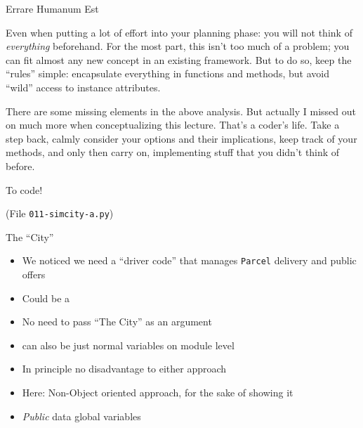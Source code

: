 
\begin{frame}{Errare Humanum Est}
%
\begin{hintbox}
Even when putting a lot of effort into your planning phase: you will not think of \emph{everything} beforehand. For the most part, this isn't too much of a problem; you can fit almost any new concept in an existing framework. But to do so, keep the \enquote{rules} simple: encapsulate everything in functions and methods, but avoid \enquote{wild} access to instance attributes.

\vspace{6pt}
There are some missing elements in the above analysis. But actually I missed out on much more when conceptualizing this lecture. That's a coder's life. Take a step back, calmly consider your options and their implications, keep track of your methods, and only then carry on, implementing stuff that you didn't think of before.
\end{hintbox}
%
\end{frame}


\begin{frame}{To code!}
%
\begin{center}
\begin{Large}
(File \texttt{011-simcity-a.py})
\end{Large}
\end{center}
%
\end{frame}


\begin{frame}[fragile]{The \enquote{City}}
%
\begin{itemize}
\item We noticed we need a \enquote{driver code} that manages \texttt{Parcel} delivery and public offers
\item Could be a 
\item No need to pass \enquote{The City} as an argument
\item[\Thus] can also be just normal variables on module level
\item In principle no disadvantage to either approach
\item Here: Non-Object oriented approach, for the sake of showing it
\item \emph{Public} data \Thus global variables
\end{itemize}
%
\end{frame}

